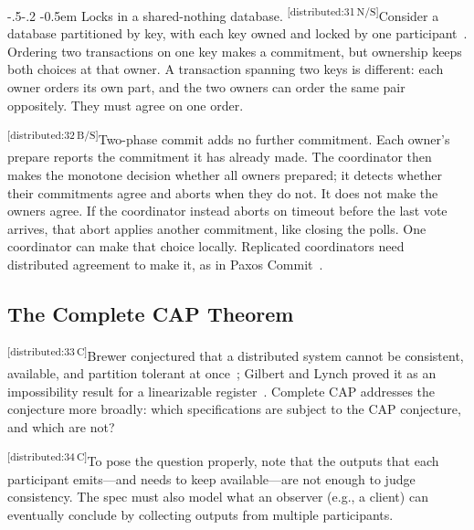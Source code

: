 \documentclass[sigconf]{cidr-2027}
\makeatletter
\theoremstyle{remark}
\renewcommand\paragraph{\@startsection{paragraph}{4}{\z@}%
  {-.5\baselineskip \@plus -2\p@ \@minus -.2\p@}%
  {-0.5em}%
  {\normalfont\bfseries}}
\newcommand{\commitment}{commitment\xspace}
\newcommand{\commitments}{commitments\xspace}
\newcommand{\cxtag}[2]{\textsuperscript{\textsf{\tiny[#1\,#2]}}}
\makeatother
\begin{document}
\paragraph{Locks in a shared-nothing database.}
\color{black}\cxtag{distributed:31}{N/S}Consider a database partitioned by key, with each key owned and locked by one
participant~\cite{stonebraker1986sharednothing}.  Ordering two transactions on
one key makes a \commitment, but ownership keeps both choices at that owner.  A
transaction spanning two keys is different: each owner orders its own part, and
the two owners can order the same pair oppositely.  They must agree on one
order.\color{black}

\color{blue!75!black}\cxtag{distributed:32}{B/S}Two-phase commit adds no further \commitment.  Each owner's prepare reports the
\commitment it has already made.  The coordinator then makes the monotone
decision whether all owners prepared; it detects whether their \commitments
agree and aborts when they do not.  It does not make the owners agree.  If the
coordinator instead aborts on timeout before the last vote arrives, that abort
applies another \commitment, like closing the polls.  One coordinator can make
that choice locally.  Replicated coordinators need distributed agreement to
make it, as in Paxos Commit~\cite{gray2006consensus}.\color{black}

\subsection{The Complete CAP Theorem}
\label{sec:complete-cap}

\color{black!45}\cxtag{distributed:33}{C}Brewer conjectured that a distributed system cannot be consistent, available,
and partition tolerant at once~\cite{brewer2000towards}; Gilbert and Lynch
proved it as an impossibility result for a linearizable register~\cite{gilbert2002cap}.
Complete CAP addresses the conjecture more broadly:
which specifications are subject to the CAP
conjecture, and which are not?\color{black}

\color{black!45}\cxtag{distributed:34}{C}To pose the question properly, note that the outputs that each participant emits---and
needs to keep available---are not enough to judge consistency. The spec
must also model what an observer (e.g., a client) can eventually conclude by collecting
outputs from multiple participants.\color{black}
\end{document}
